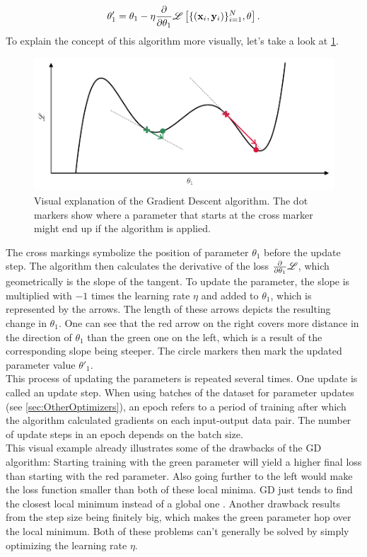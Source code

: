 \begin{equation}
	\theta_1' = \theta_1 - \eta \frac{\partial}{\partial\theta_1} \mathscr{L}\left[ \{(\mathbf{x}_i, \mathbf{y}_i)\}_{i=1}^{N}, \theta \right].
\end{equation}
To explain the concept of this algorithm more visually, let's take a look at \cref{fig:gd_explanation_plot}. 
\begin{figure}
	\centering
	\includegraphics[width = \textwidth]{text/MachineLearningBasics/plots/sgd_plot.pdf}
	\caption{Visual explanation of the Gradient Descent algorithm. The dot markers show where a parameter that starts at the cross marker might end up if the algorithm is applied.}
	\label{fig:gd_explanation_plot}
\end{figure}
The cross markings symbolize the position of parameter $\theta_1$ before the update step. The algorithm then calculates the derivative of the loss $\frac{\partial}{\partial\theta_1} \mathscr{L}$, which geometrically is the slope of the tangent. To update the parameter, the slope is multiplied with $-1$ times the learning rate $\eta$ and added to $\theta_1$, which is represented by the arrows. The length of these arrows depicts the resulting change in $\theta_1$. One can see that the red arrow on the right covers more distance in the direction of $\theta_1$ than the green one on the left, which is a result of the corresponding slope being steeper. The circle markers then mark the updated parameter value $\theta'_1$.\\
This process of updating the parameters is repeated several times. One update is called an update step. When using batches of the dataset for parameter updates (see \cref{sec:OtherOptimizers}), an epoch refers to a period of training after which the algorithm calculated gradients on each input-output data pair. The number of update steps in an epoch depends on the batch size.\\ 
This visual example already illustrates some of the drawbacks of the GD algorithm: Starting training with the green parameter will yield a higher final loss than starting with the red parameter. Also going further to the left would make the loss function smaller than both of these local minima. GD just tends to find the closest local minimum instead of a global one \cite{SGDLocalMinima}. Another drawback results from the step size being finitely big, which makes the green parameter hop over the local minimum. Both of these problems can't generally be solved by simply optimizing the learning rate $\eta$.

